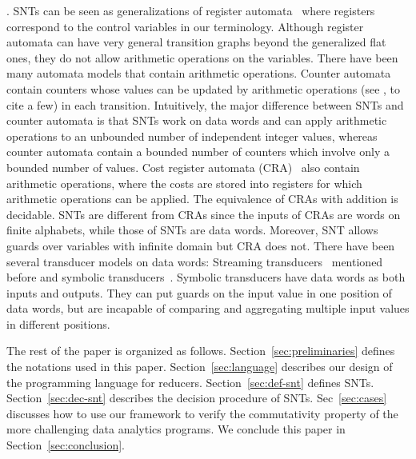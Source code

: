 .
SNTs can be seen as generalizations of register automata~\cite{KF94,NSV04} where registers correspond to the control variables in our terminology. Although register automata can have very general transition graphs beyond the generalized flat ones, they do not allow arithmetic operations on the variables.
There have been many automata models that contain arithmetic operations. Counter automata contain counters whose values can be updated by arithmetic operations (see \cite{Iba78,CJ98,LS06,HH14,FGH13}, to cite a few) in each transition.  Intuitively, the major difference between SNTs and counter automata is that SNTs work on data words and can apply arithmetic operations to an unbounded number of independent integer values, whereas  counter automata contain a bounded number of counters which involve only  a bounded number of values. Cost register automata (CRA)~\cite{ADD+13} also contain arithmetic operations, where the costs are stored into registers for which arithmetic operations can be applied. The equivalence of CRAs with addition is decidable. SNTs are different from CRAs since the inputs of CRAs are words on finite alphabets, while those of SNTs are data words. 
Moreover, SNT allows guards over variables with infinite domain but CRA does not. 
%
%
There have been several transducer models on data words: Streaming transducers~\cite{RP11} mentioned before and symbolic transducers~\cite{VHL+12}. Symbolic transducers have data words as both inputs and outputs. They can put guards on the input value in one position of data words, but are incapable of comparing and aggregating multiple input values in different positions.  

The rest of the paper is organized as follows. Section~\ref{sec:preliminaries} defines the notations used in this paper. Section~\ref{sec:language} describes our design of the programming language for reducers. Section~\ref{sec:def-snt} defines SNTs. Section~\ref{sec:dec-snt} describes the decision procedure of SNTs. Sec~\ref{sec:cases} discusses how to use our framework to verify the commutativity property of the more challenging data analytics programs. We conclude this paper in Section~\ref{sec:conclusion}. 